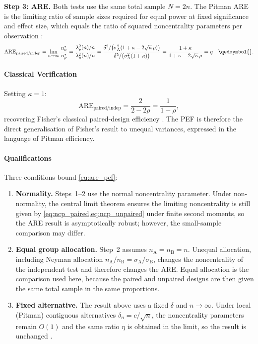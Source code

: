 \noindent\textbf{Step 3: ARE.} Both tests use the same total sample $N=2n$. The Pitman ARE is the limiting ratio of sample sizes required for equal power at fixed significance and effect size, which equals the ratio of squared noncentrality parameters per observation \parencite{lehmann1999}:
\begin{equation}
  \mathrm{ARE}_{\mathrm{paired/indep}}
    = \lim_{n\to\infty}\frac{n_{u}^{*}}{n_{p}^{*}}
    = \frac{\lambda_{p}^{2}(n)/n}{\lambda_{u}^{2}(n)/n}
    = \frac{\delta^{2}/\bigl(\sigma^{2}_{\mathrm{A}}(1+\kappa-2\sqrt{\kappa}\,\rho)\bigr)}
           {\delta^{2}/\bigl(\sigma^{2}_{\mathrm{A}}(1+\kappa)\bigr)}
    = \frac{1+\kappa}{1+\kappa-2\sqrt{\kappa}\,\rho}
    = \eta \phantom{00} \qedsymbol{}.
\end{equation}

\paragraph*{Classical Verification}

Setting $\kappa=1$:
\begin{equation*}
  \mathrm{ARE}_{\mathrm{paired/indep}} = \frac{2}{2-2\rho} = \frac{1}{1-\rho},
\end{equation*}
recovering Fisher's classical paired-design efficiency \parencite{fisher1935}. The PEF is therefore the direct generalisation of Fisher's result to unequal variances, expressed in the language of Pitman efficiency.

\paragraph*{Qualifications}

Three conditions bound \cref{eq:are_pef}:

\begin{enumerate}
  \item \textbf{Normality.} Steps~1--2 use the normal noncentrality parameter. Under non-normality, the central limit theorem ensures the limiting noncentrality is still given by \cref{eq:ncp_paired,eq:ncp_unpaired} under finite second moments, so the ARE result is asymptotically robust; however, the small-sample comparison may differ.

  \item \textbf{Equal group allocation.} Step~2 assumes $n_{\mathrm{A}}=n_{\mathrm{B}}=n$. Unequal allocation, including Neyman allocation $n_{\mathrm{A}}/n_{\mathrm{B}}=\sigma_{\mathrm{A}}/\sigma_{\mathrm{B}}$, changes the noncentrality of the independent test and therefore changes the ARE. Equal allocation is the comparison used here, because the paired and unpaired designs are then given the same total sample in the same proportions.

  \item \textbf{Fixed alternative.} The result above uses a fixed $\delta$ and $n\to\infty$. Under local (Pitman) contiguous alternatives $\delta_{n}=c/\sqrt{n}$, the noncentrality parameters remain $O(1)$ and the same ratio $\eta$ is obtained in the limit, so the result is unchanged \parencite{lehmann1999}.
\end{enumerate}

